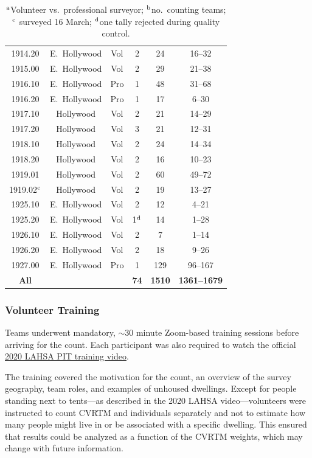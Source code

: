 \documentclass[11pt,twocolumn]{article}
\def\Count{count}
\begin{document}
\begin{table}[t!]
{\begin{tabular}{cccccc}
1914.20 & E.~Hollywood & Vol & 2 & 24 & 16--32 \\
1915.00 & E.~Hollywood & Vol & 2 & 29 & 21--38 \\
1916.10 & E.~Hollywood & Pro & 1 & 48 & 31--68 \\
1916.20 & E.~Hollywood & Pro & 1 & 17 & 6--30 \\
1917.10 & Hollywood & Vol & 2 & 21 & 14--29 \\
1917.20 & Hollywood & Vol & 3 & 21 & 12--31 \\
1918.10 & Hollywood & Vol & 2 & 24 & 14--34 \\
1918.20 & Hollywood & Vol & 2 & 16 & 10--23 \\
1919.01 & Hollywood & Vol & 2 & 60 & 49--72 \\
1919.02$^{\rm c}$  & Hollywood & Vol & 2 & 19 & 13--27 \\
1925.10 & E.~Hollywood & Vol & 2 & 12 & 4--21 \\
1925.20 & E.~Hollywood & Vol & 1$^{\rm d}$ & 14 & 1--28 \\
1926.10 & E.~Hollywood & Vol & 2 & 7 & 1--14 \\
1926.20 & E.~Hollywood & Vol & 2 & 18 & 9--26 \\
1927.00 & E.~Hollywood & Pro & 1 & 129 & 96--167\\
\cmidrule{1-6}
{\bf All} & & & {\bf 74} & {\bf 1510} & {\bf 1361--1679}\\ 
\bottomrule
\end{tabular}
}
\caption*{$^{\rm a}$Volunteer vs.~professional surveyor; $^{\rm b}$no.~counting teams; 
		$^{\rm c}$ surveyed 16 March; $^{\rm d}$one tally rejected during quality control.}
\label{tbl:tractStats}
\end{table}

\subsubsection{Volunteer Training}
\label{sec:training}

Teams underwent mandatory, $\sim$30 minute Zoom-based training sessions before arriving 
for the \Count. Each participant was also required to watch the official 
\href{https://www.youtube.com/watch?v=ul94Jt6l68w}{2020 LAHSA PIT training video}.%

The training covered the motivation for the \Count, an overview of the survey geography, team roles, 
and examples of unhoused dwellings. Except for people standing next to tents---as described 
in the 2020 LAHSA video---volunteers were instructed to count CVRTM and individuals separately 
and not to estimate how many people might live in or be associated with a specific dwelling. 
This ensured that results could be analyzed as a function of the CVRTM weights, which may change 
with future information.%
\end{document}
